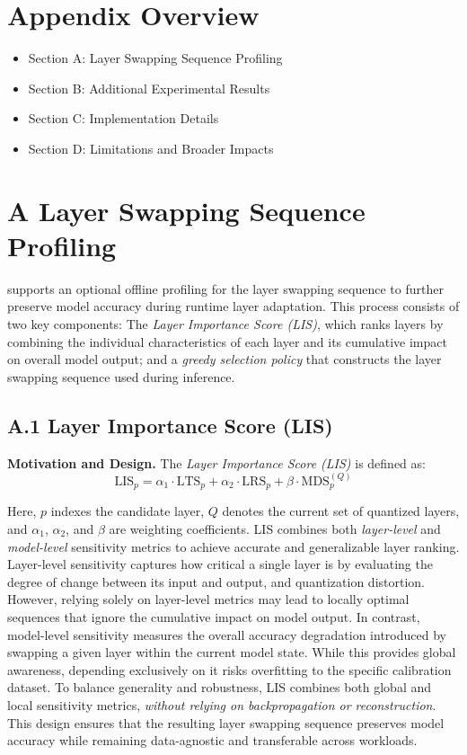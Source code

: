 \section*{Appendix Overview}
\label{sec:appendix}
\begin{itemize}
    \item Section A: Layer Swapping Sequence Profiling
    \item Section B: Additional Experimental Results
    \item Section C: Implementation Details
    \item Section D: Limitations and Broader Impacts
\end{itemize}

\section*{A \quad Layer Swapping Sequence Profiling}
\label{sec:layer_profiling}

{\system} supports an optional offline profiling for the layer swapping sequence to further preserve model accuracy during runtime layer adaptation. This process consists of two key components: 
The \emph{Layer Importance Score (LIS)}, which ranks layers by combining the individual characteristics of each layer and its cumulative impact on overall model output;
and a \emph{greedy selection policy} that constructs the layer swapping sequence used during inference. 


\subsection*{A.1 \quad Layer Importance Score (LIS)}
\label{appendix:LIS}

\noindent\textbf{Motivation and Design.}
The \emph{Layer Importance Score (LIS)} is defined as:
\begin{equation}
\text{LIS}_p = \alpha_1 \cdot \text{LTS}_p + \alpha_2 \cdot \text{LRS}_p + \beta \cdot \text{MDS}_p^{(Q)}
\label{eq:LIS}
\end{equation}

Here, $p$ indexes the candidate layer, $Q$ denotes the current set of quantized layers, and $\alpha_1$, $\alpha_2$, and $\beta$ are weighting coefficients.
LIS 
combines both \emph{layer-level} and \emph{model-level} sensitivity metrics to achieve accurate and generalizable layer ranking. Layer-level sensitivity captures how critical a single layer is by evaluating the degree of change between its input and output,
and quantization distortion. However, relying solely on layer-level metrics may lead to locally optimal sequences that ignore the cumulative impact on model output.
In contrast, model-level sensitivity measures the overall accuracy degradation introduced by swapping a given layer within the current model state. While this provides global awareness, depending exclusively on it risks overfitting to the specific calibration dataset.
To balance generality and robustness, LIS combines both global and local sensitivity metrics, \emph{without relying on backpropagation or reconstruction}.
This design ensures that the resulting layer swapping sequence preserves model accuracy while remaining data-agnostic and transferable across workloads. 


